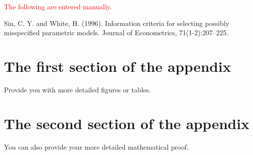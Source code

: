 \documentclass[utf8,12pt]{article} %
\begin{document}
%
%


%
\laref \textcolor{red}{The following are entered manually.}\par
\laref Sin, C. Y. and White, H. (1996). Information criteria for selecting possibly misspecified parametric models. Journal of Econometrics, 71(1-2):207–225.
%
%
\appendix
\appendixpage
\section{The first section of the appendix}
%
\begin{spacing}{1.5}
%
	Provide you with more detailed figures or tables.
%
\end{spacing}
%
\section{The second section of the appendix}
%
\begin{spacing}{1.5}
%
	You can also provide your more detailed mathematical proof.
%
\end{spacing}
%
\end{document}
